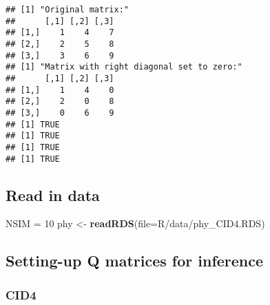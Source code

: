 \documentclass[
]{article}
\newenvironment{Shaded}{\begin{snugshade}}{\end{snugshade}}
\newcommand{\AttributeTok}[1]{\textcolor[rgb]{0.13,0.29,0.53}{#1}}
\newcommand{\DecValTok}[1]{\textcolor[rgb]{0.00,0.00,0.81}{#1}}
\newcommand{\FunctionTok}[1]{\textcolor[rgb]{0.13,0.29,0.53}{\textbf{#1}}}
\newcommand{\NormalTok}[1]{#1}
\newcommand{\OtherTok}[1]{\textcolor[rgb]{0.56,0.35,0.01}{#1}}
\newcommand{\StringTok}[1]{\textcolor[rgb]{0.31,0.60,0.02}{#1}}
\begin{document}
\begin{verbatim}
## [1] "Original matrix:"
##      [,1] [,2] [,3]
## [1,]    1    4    7
## [2,]    2    5    8
## [3,]    3    6    9
## [1] "Matrix with right diagonal set to zero:"
##      [,1] [,2] [,3]
## [1,]    1    4    0
## [2,]    2    0    8
## [3,]    0    6    9
## [1] TRUE
## [1] TRUE
## [1] TRUE
## [1] TRUE
\end{verbatim}

\hypertarget{read-in-data}{%
\subsection{Read in data}\label{read-in-data}}

\begin{Shaded}
\begin{Highlighting}[]
\NormalTok{NSIM }\OtherTok{=} \DecValTok{10}
\NormalTok{phy }\OtherTok{\textless{}{-}} \FunctionTok{readRDS}\NormalTok{(}\AttributeTok{file=}\StringTok{\textquotesingle{}R/data/phy\_CID4.RDS\textquotesingle{}}\NormalTok{)}
\end{Highlighting}
\end{Shaded}

\hypertarget{setting-up-q-matrices-for-inference}{%
\subsection{Setting-up Q matrices for inference}\label{setting-up-q-matrices-for-inference}}

\hypertarget{cid4}{%
\subsubsection{CID4}\label{cid4}}
\end{document}
